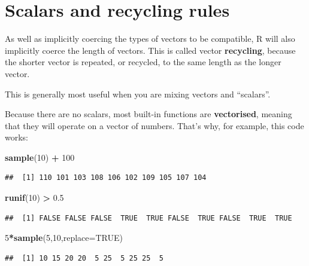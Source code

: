 \documentclass[
]{book}
\newenvironment{Shaded}{\begin{snugshade}}{\end{snugshade}}
\newcommand{\DataTypeTok}[1]{\textcolor[rgb]{0.13,0.29,0.53}{#1}}
\newcommand{\DecValTok}[1]{\textcolor[rgb]{0.00,0.00,0.81}{#1}}
\newcommand{\FloatTok}[1]{\textcolor[rgb]{0.00,0.00,0.81}{#1}}
\newcommand{\KeywordTok}[1]{\textcolor[rgb]{0.13,0.29,0.53}{\textbf{#1}}}
\newcommand{\NormalTok}[1]{#1}
\newcommand{\OperatorTok}[1]{\textcolor[rgb]{0.81,0.36,0.00}{\textbf{#1}}}
\newcommand{\OtherTok}[1]{\textcolor[rgb]{0.56,0.35,0.01}{#1}}
\newcommand{\StringTok}[1]{\textcolor[rgb]{0.31,0.60,0.02}{#1}}
\begin{document}
\hypertarget{scalars-and-recycling-rules}{%
\section{Scalars and recycling rules}\label{scalars-and-recycling-rules}}

As well as implicitly coercing the types of vectors to be compatible, R will also implicitly coerce the length of vectors.
This is called vector \textbf{recycling}, because the shorter vector is repeated, or recycled, to the same length as the longer vector.

This is generally most useful when you are mixing vectors and ``scalars''.

Because there are no scalars, most built-in functions are \textbf{vectorised}, meaning that they will operate on a vector of numbers.
That's why, for example, this code works:

\begin{Shaded}
\begin{Highlighting}[]
\KeywordTok{sample}\NormalTok{(}\DecValTok{10}\NormalTok{) }\OperatorTok{+}\StringTok{ }\DecValTok{100}
\end{Highlighting}
\end{Shaded}

\begin{verbatim}
##  [1] 110 101 103 108 106 102 109 105 107 104
\end{verbatim}

\begin{Shaded}
\begin{Highlighting}[]
\KeywordTok{runif}\NormalTok{(}\DecValTok{10}\NormalTok{) }\OperatorTok{>}\StringTok{ }\FloatTok{0.5}
\end{Highlighting}
\end{Shaded}

\begin{verbatim}
##  [1] FALSE FALSE FALSE  TRUE  TRUE FALSE  TRUE FALSE  TRUE  TRUE
\end{verbatim}

\begin{Shaded}
\begin{Highlighting}[]
\DecValTok{5}\OperatorTok{*}\KeywordTok{sample}\NormalTok{(}\DecValTok{5}\NormalTok{,}\DecValTok{10}\NormalTok{,}\DataTypeTok{replace=}\OtherTok{TRUE}\NormalTok{)}
\end{Highlighting}
\end{Shaded}

\begin{verbatim}
##  [1] 10 15 20 20  5 25  5 25 25  5
\end{verbatim}
\end{document}
